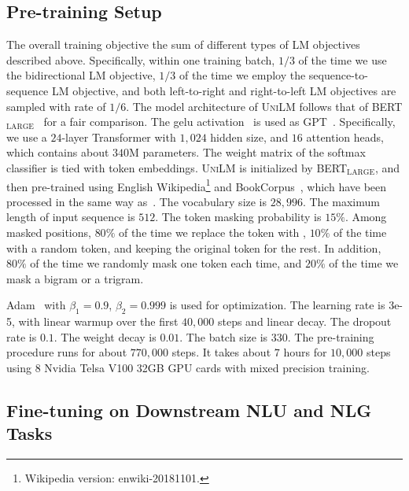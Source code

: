 \documentclass{article}
\newcommand\ours{\textsc{UniLM}}
\begin{document}
\subsection{Pre-training Setup}

The overall training objective the sum of different types of LM objectives described above.
Specifically, within one training batch, $1/3$ of the time we use the bidirectional LM objective, $1/3$ of the time we employ the sequence-to-sequence LM objective, and both left-to-right and right-to-left LM objectives are sampled with rate of $1/6$.
The model architecture of \ours{} follows that of BERT$_\text{LARGE}$~\cite{bert} for a fair comparison. 
The gelu activation~\cite{gelu} is used as GPT~\cite{gpt}.
Specifically, we use a $24$-layer Transformer with $1,024$ hidden size, and $16$ attention heads, which contains about $340$M parameters. The weight matrix of the softmax classifier is tied with token embeddings.
\ours{} is initialized by BERT$_\text{LARGE}$, and then pre-trained using English Wikipedia\footnote{Wikipedia version: enwiki-20181101.} and BookCorpus~\cite{bookcorpus}, which have been processed in the same way as~\cite{bert}.
The vocabulary size is $28,996$. The maximum length of input sequence is $512$. The token masking probability is $15\%$. 
Among masked positions, $80\%$ of the time we replace the token with , $10\%$ of the time with a random token, and keeping the original token for the rest. In addition, $80\%$ of the time we randomly mask one token each time, and $20\%$ of the time we mask a bigram or a trigram.

Adam~\cite{adam} with $\beta_1=0.9$, $\beta_2=0.999$ is used for optimization. The learning rate is 3e-5, with linear warmup over the first $40,000$ steps and linear decay. The dropout rate is $0.1$. The weight decay is $0.01$. The batch size is $330$. 
The pre-training procedure runs for about $770,000$ steps. It takes about $7$ hours for $10,000$ steps using $8$ Nvidia Telsa V100 32GB GPU cards with mixed precision training.


\subsection{Fine-tuning on Downstream NLU and NLG Tasks}
\label{sec:fine-tuning}
\end{document}
